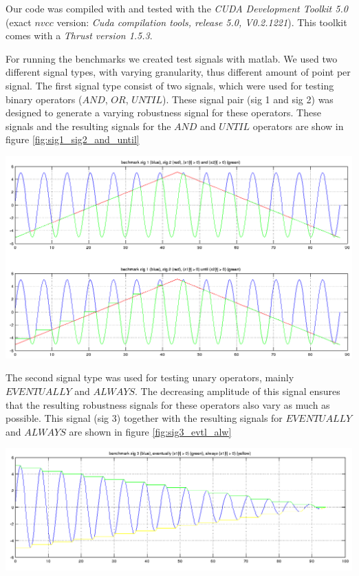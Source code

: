 \documentclass[a4paper,10pt]{article}
\begin{document}
Our code was compiled with and tested with the {\it CUDA Development Toolkit 5.0} (exact $nvcc$ version: {\it Cuda compilation tools, release 5.0, V0.2.1221}). This toolkit comes with a {\it Thrust version 1.5.3}.

For running the benchmarks we created test signals with matlab. We used two different signal types, with varying granularity, thus different amount of point per signal. 
The first signal type consist of two signals, which were used for testing binary operators ($AND$, $OR$, $UNTIL$). These signal pair (sig 1 and sig 2) was designed to generate a varying robustness signal for these operators.
These signals and the resulting signals for the $AND$ and $UNTIL$ operators are show in figure \ref{fig:sig1_sig2_and_until}
\begin{center}
    \includegraphics[scale=0.3]{bm_sig1_and_until.png}
    \label{fig:sig1_sig2_and_until}
\end{center}    
The second signal type was used for testing unary operators, mainly $EVENTUALLY$ and $ALWAYS$. The decreasing amplitude of this signal ensures that the resulting robustness signals for these operators also vary as much as possible. This signal (sig 3) together with the resulting signals for $EVENTUALLY$ and $ALWAYS$ are shown in figure \ref{fig:sig3_evtl_alw}
\begin{center}
    \includegraphics[scale=0.3]{bm_sig3_ev_alw.png}
    \label{fig:sig3_evtl_alw}
\end{center}
\end{document}
